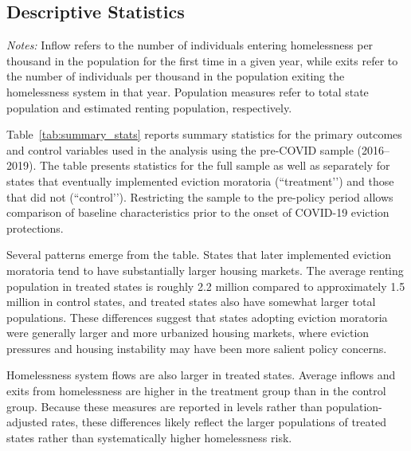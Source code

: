 \documentclass[12pt]{article}
\begin{document}
\subsection{Descriptive Statistics}

\begin{table}
\centering
\begin{threeparttable}
\caption{Pre-COVID Summary Statistics}
\label{tab:summary_stats}

\begin{tablenotes}[flushleft]
\footnotesize
\item \textit{Notes:} Inflow refers to the number of individuals entering homelessness per thousand in the population for the first time in a given year, while exits refer to the number of individuals per thousand in the population exiting the homelessness system in that year. Population measures refer to total state population and estimated renting population, respectively.
\end{tablenotes}
\end{threeparttable}
\end{table}

Table~\ref{tab:summary_stats} reports summary statistics for the primary outcomes and control variables used in the analysis using the pre-COVID sample (2016–2019). The table presents statistics for the full sample as well as separately for states that eventually implemented eviction moratoria (“treatment’’) and those that did not (“control’’). Restricting the sample to the pre-policy period allows comparison of baseline characteristics prior to the onset of COVID-19 eviction protections.

Several patterns emerge from the table. States that later implemented eviction moratoria tend to have substantially larger housing markets. The average renting population in treated states is roughly 2.2 million compared to approximately 1.5 million in control states, and treated states also have somewhat larger total populations. These differences suggest that states adopting eviction moratoria were generally larger and more urbanized housing markets, where eviction pressures and housing instability may have been more salient policy concerns.

Homelessness system flows are also larger in treated states. Average inflows and exits from homelessness are higher in the treatment group than in the control group. Because these measures are reported in levels rather than population-adjusted rates, these differences likely reflect the larger populations of treated states rather than systematically higher homelessness risk.
\end{document}
